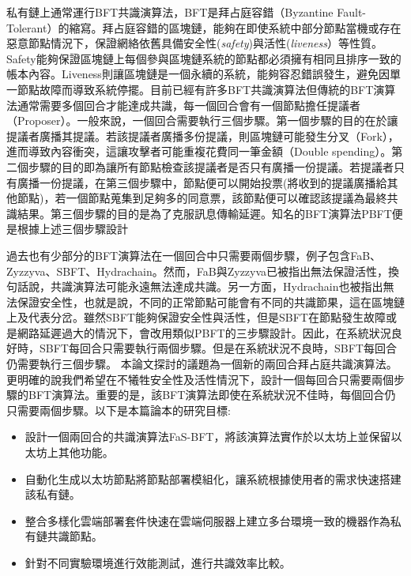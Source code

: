 私有鏈上通常運行BFT共識演算法，BFT是拜占庭容錯（Byzantine Fault-Tolerant）的縮寫。拜占庭容錯的區塊鏈，能夠在即使系統中部分節點當機或存在惡意節點情況下，保證網絡依舊具備安全性({\em safety})與活性({\em liveness}）等性質。Safety能夠保證區塊鏈上每個參與區塊鏈系統的節點都必須擁有相同且排序一致的帳本內容。Liveness則讓區塊鏈是一個永續的系統，能夠容忍錯誤發生，避免因單一節點故障而導致系統停擺。目前已經有許多BFT共識演算法但傳統的BFT演算法通常需要多個回合才能達成共識，每一個回合會有一個節點擔任提議者（Proposer）。一般來說，一個回合需要執行三個步驟。第一個步驟的目的在於讓提議者廣播其提議。若該提議者廣播多份提議，則區塊鏈可能發生分叉（Fork），進而導致內容衝突，這讓攻擊者可能重複花費同一筆金額（Double spending）。第二個步驟的目的即為讓所有節點檢查該提議者是否只有廣播一份提議。若提議者只有廣播一份提議，在第三個步驟中，節點便可以開始投票(將收到的提議廣播給其他節點)，若一個節點蒐集到足夠多的同意票，該節點便可以確認該提議為最終共識結果。第三個步驟的目的是為了克服訊息傳輸延遲。知名的BFT演算法PBFT\cite{castro1999practical}便是根據上述三個步驟設計

過去也有少部分的BFT演算法在一個回合中只需要兩個步驟，例子包含FaB\cite{abraham2018revisiting}、Zyzzyva\cite{kotla2007zyzzyva}、SBFT\cite{martin2006fast}、Hydrachain\cite{Hydrachain}。然而，FaB與Zyzzyva已被指出無法保證活性，換句話說，共識演算法可能永遠無法達成共識。另一方面，Hydrachain也被指出無法保證安全性，也就是說，不同的正常節點可能會有不同的共識節果，這在區塊鏈上及代表分岔。雖然SBFT能夠保證安全性與活性，但是SBFT在節點發生故障或是網路延遲過大的情況下，會改用類似PBFT的三步驟設計。因此，在系統狀況良好時，SBFT每回合只需要執行兩個步驟。但是在系統狀況不良時，SBFT每回合仍需要執行三個步驟。
本論文探討的議題為一個新的兩回合拜占庭共識演算法。更明確的說我們希望在不犧牲安全性及活性情況下，設計一個每回合只需要兩個步驟的BFT演算法。重要的是，該BFT演算法即使在系統狀況不佳時，每個回合仍只需要兩個步驟。以下是本篇論本的研究目標: 

\begin{itemize}%
\item 設計一個兩回合的共識演算法FaS-BFT，將該演算法實作於以太坊上並保留以太坊上其他功能。
\item 自動化生成以太坊節點將節點部署模組化，讓系統根據使用者的需求快速搭建該私有鏈。
\item 整合多樣化雲端部署套件快速在雲端伺服器上建立多台環境一致的機器作為私有鏈共識節點。
\item 針對不同實驗環境進行效能測試，進行共識效率比較。 
\end{itemize}





